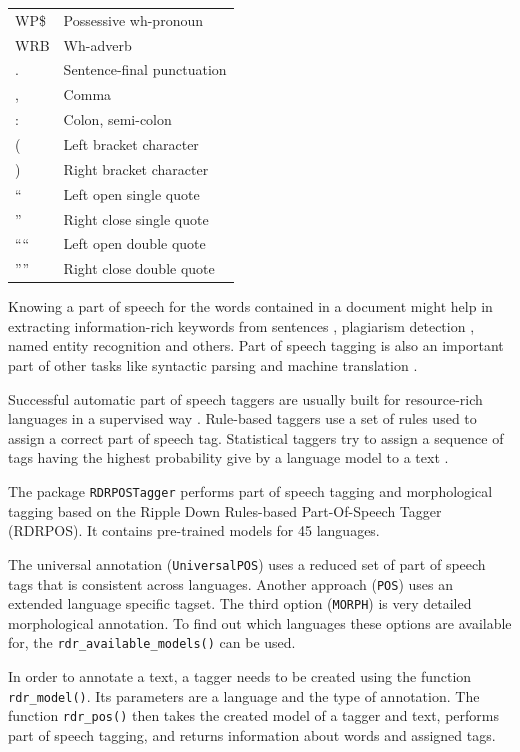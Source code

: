 \begin{table}[H]
\begin{tabular}{ll}
WP\$ & Possessive wh-pronoun \\
WRB  & Wh-adverb \\
.    & Sentence-final punctuation \\
,    & Comma \\
:    & Colon, semi-colon \\
(    & Left bracket character \\
)    & Right bracket character \\
``    & Left open single quote \\
''    & Right close single quote \\
````  & Left open double quote \\
''''  & Right close double quote \\
\hline
\end{tabular}
\end{table}

Knowing a part of speech for the words contained in a document might help
in extracting information-rich keywords from sentences \cite{ref146}, plagiarism detection \cite{ref124}, named entity recognition \cite{ref168} and others. Part of speech tagging is
also an important part of other tasks like syntactic parsing and machine translation \cite{ref43}.

Successful automatic part of speech taggers are usually built for resource-rich
languages in a supervised way \cite{ref288}. Rule-based taggers use a set of rules used
to assign a correct part of speech tag. Statistical taggers try to assign a sequence
of tags having the highest probability give by a language model to a text \cite{ref37}.

The package \texttt{RDRPOSTagger} performs part of speech tagging and morphological tagging based on the Ripple Down Rules-based Part-Of-Speech Tagger
(RDRPOS). It contains pre-trained models for 45 languages.

The universal annotation (\texttt{UniversalPOS}) uses a reduced set of part of
speech tags that is consistent across languages. Another approach (\texttt{POS}) uses
an extended language specific tagset. The third option (\texttt{MORPH}) is very detailed
morphological annotation. To find out which languages these options are available for, the \texttt{rdr\_available\_models()} can be used.

In order to annotate a text, a tagger needs to be created using the function
\texttt{rdr\_model()}. Its parameters are a language and the type of annotation. The
function \texttt{rdr\_pos()} then takes the created model of a tagger and text, performs
part of speech tagging, and returns information about words and assigned tags.


